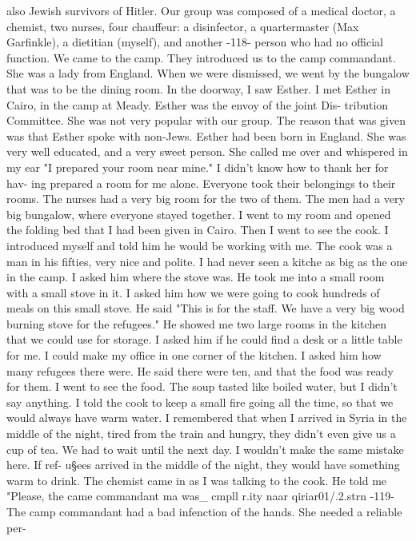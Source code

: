 also Jewish survivors of Hitler. 
Our group was composed of a medical doctor, a chemist, two nurses, four chauffeur: 
a disinfector, a quartermaster (Max 
Garfinkle), a dietitian (myself), and another 
-118- 
person who had no official function. We came to the camp. They introduced us to 
the camp commandant. She was a lady from England. When we were dismissed, we went 
by the bungalow that was to be the dining room. In the doorway, I saw Esther. I 
met Esther in Cairo, in the camp at Meady. Esther was the envoy of the joint Dis-
tribution Committee. She was not very popular with our group. The reason that was 
given was that Esther spoke with non-Jews. Esther had been born in England. She 
was very well educated, and a very sweet person. She called me over and whispered 
in my ear "I prepared your room near mine." I didn't know how to thank her for hav-
ing prepared a room for me alone. 
Everyone took their belongings to their rooms. The nurses had a very big room 
for the two of them. The men had a very big bungalow, where everyone stayed together. 
I went to my room and opened the folding bed that I had been given in Cairo. Then 
I went to see the cook. I introduced myself and told him he would be working with 
me. The cook was a man in his fifties, very nice and polite. I had never seen a kitche 
as big as the one in the camp. I asked him where the stove was. He took me into a 
small room with a small stove in it. I asked him how we were going to cook hundreds 
of meals on this small stove. He said "This is for the staff. We have a very big 
wood burning stove for the refugees." 
He showed me two large rooms in the kitchen that we could use for storage. I 
asked him if he could find a desk or a little table for me. I could make my 
office in one corner of the kitchen. I asked him how many refugees there were. He 
said there were ten, and that the food was ready for them. 
I went to see the food. The soup tasted like boiled water, but I didn't say 
anything. I told the cook to keep a small fire going all the time, so that we would 
always have warm water. I remembered that when I arrived in Syria in the middle of 
the night, tired from the train and hungry, they didn't even give us a cup of tea. 
We had to wait until the next day. I wouldn't make the same mistake here. If ref-
u§ees arrived in the middle of the night, they would have something warm to drink. 
The chemist came in as I was talking to the cook. He told me "Please, the 
came commandant ma 
was_ 
cmpll r.ity naar qiriar01/.2.strn 
-119- 
The camp commandant had a bad infenction of the hands. She needed a reliable per-
